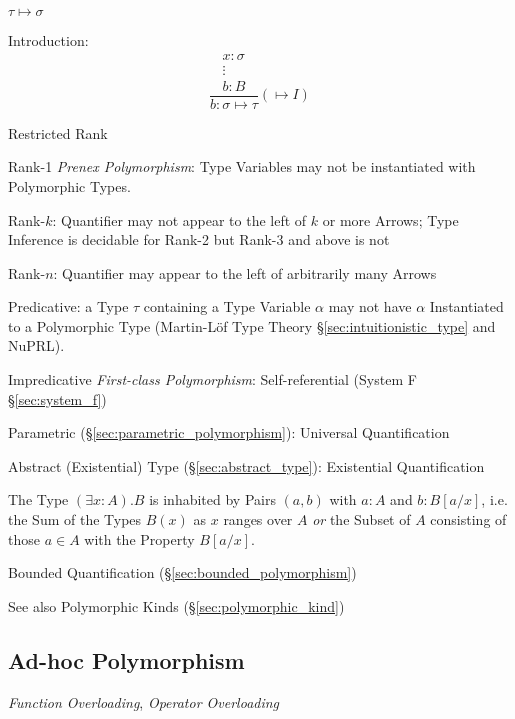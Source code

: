 \asterism


$\tau \mapsto \sigma$

Introduction:
\[
  {
  \frac{
    \begin{matrix}
      x : \sigma \\
      \vdots \\
      b : B
    \end{matrix}
  }
  {b : \sigma \mapsto \tau}
  }(\mapsto I)
\]


\asterism


Restricted Rank

Rank-1 \emph{Prenex Polymorphism}: Type Variables may not be
instantiated with Polymorphic Types.

Rank-$k$: Quantifier may not appear to the left of $k$ or more Arrows;
Type Inference is decidable for Rank-2 but Rank-3 and above is not

Rank-$n$: Quantifier may appear to the left of arbitrarily many Arrows

Predicative: a Type $\tau$ containing a Type Variable $\alpha$ may not
have $\alpha$ Instantiated to a Polymorphic Type (Martin-L\"of Type
Theory \S\ref{sec:intuitionistic_type} and NuPRL).

Impredicative \emph{First-class Polymorphism}: Self-referential
(System F \S\ref{sec:system_f})

Parametric (\S\ref{sec:parametric_polymorphism}): Universal
Quantification

Abstract (Existential) Type (\S\ref{sec:abstract_type}): Existential
Quantification

The Type $(\exists x : A).B$ is inhabited by Pairs $(a,b)$ with $a:A$
and $b:B[a/x]$, i.e. the Sum of the Types $B(x)$ as $x$ ranges over
$A$ \emph{or} the Subset of $A$ consisting of those $a \in A$ with the
Property $B[a/x]$.

Bounded Quantification (\S\ref{sec:bounded_polymorphism})

\fist See also Polymorphic Kinds (\S\ref{sec:polymorphic_kind})



\subsection{Ad-hoc Polymorphism}\label{sec:adhoc_polymorphism}

\emph{Function Overloading}, \emph{Operator Overloading}


